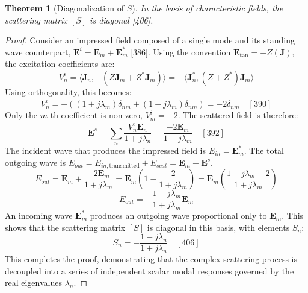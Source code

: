 \documentclass[11pt]{article}
\newcommand{\vect}[1]{\mathbf{#1}}
\newcommand{\sprod}[2]{\langle #1, #2 \rangle}
\newtheorem{theorem}{Theorem}[section]
\theoremstyle{definition}
\begin{document}
\begin{theorem}[Diagonalization of $S$]
In the basis of characteristic fields, the scattering matrix $[S]$ is diagonal [406].
\end{theorem}
\begin{proof}
Consider an impressed field composed of a single mode and its standing wave counterpart, $\vect{E}^i = \vect{E}_m + \vect{E}_m^*$ [386]. Using the convention $\vect{E}_{\text{tan}} = -Z(\vect{J})$, the excitation coefficients are:
\[ V_n^i = \sprod{\vect{J}_n}{-(Z\vect{J}_m + Z^*\vect{J}_m)} = -\sprod{\vect{J}_n^*}{(Z+Z^*)\vect{J}_m} \]
Using orthogonality, this becomes:
\[ V_n^i = - ( (1+j\lambda_m)\delta_{nm} + (1-j\lambda_m)\delta_{nm} ) = -2\delta_{nm} \quad [390] \]
Only the $m$-th coefficient is non-zero, $V_m^i = -2$. The scattered field is therefore:
\[ \vect{E}^s = \sum_n \frac{V_n^i \vect{E}_n}{1+j\lambda_n} = \frac{-2\vect{E}_m}{1+j\lambda_m} \quad [392] \]
The incident wave that produces the impressed field is $E_{in} = \vect{E}_m^*$. The total outgoing wave is $E_{out} = E_{in, \text{transmitted}} + E_{scat} = \vect{E}_m + \vect{E}^s$.
\[ E_{out} = \vect{E}_m + \frac{-2\vect{E}_m}{1+j\lambda_m} = \vect{E}_m \left( 1 - \frac{2}{1+j\lambda_m} \right) = \vect{E}_m \left( \frac{1+j\lambda_m - 2}{1+j\lambda_m} \right) \]
\[ E_{out} = -\frac{1-j\lambda_m}{1+j\lambda_m} \vect{E}_m \]
An incoming wave $\vect{E}_m^*$ produces an outgoing wave proportional only to $\vect{E}_m$. This shows that the scattering matrix $[S]$ is diagonal in this basis, with elements $S_n$:
\begin{equation}
S_n = -\frac{1-j\lambda_n}{1+j\lambda_n} \quad [406]
\end{equation}
This completes the proof, demonstrating that the complex scattering process is decoupled into a series of independent scalar modal responses governed by the real eigenvalues $\lambda_n$.
\end{proof}
\end{document}
